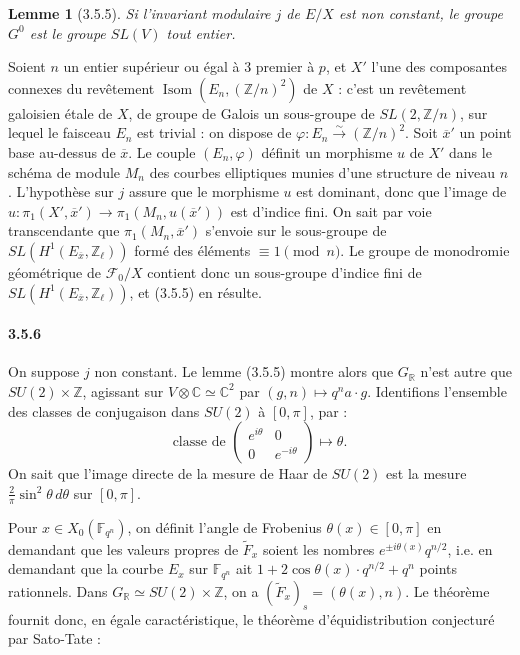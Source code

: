\documentclass[12pt,a4paper]{article}
\theoremstyle{plain}
\newtheorem{lemma}[theorem]{Lemme}
\theoremstyle{definition}
\theoremstyle{remark}
\DeclareMathOperator{\Isom}{Isom}
\newcommand{\CC}{{\mathbb{C}}}
\newcommand{\FF}{{\mathbb{F}}}
\newcommand{\RR}{{\mathbb{R}}}
\newcommand{\ZZ}{{\mathbb{Z}}}
\begin{document}
\begin{lemma}[3.5.5]
Si l'invariant modulaire $j$ de $E/X$ est non constant, le groupe $G^0$ est le groupe $SL(V)$ tout entier.
\end{lemma}

Soient $n$ un entier sup\'erieur ou \'egal \`a $3$ premier \`a $p$, et $X'$ l'une des composantes connexes du rev\^etement $\Isom(E_n, (\ZZ/n)^2)$ de $X$ : c'est un rev\^etement galoisien \'etale de $X$, de groupe de Galois un sous-groupe de $SL(2, \ZZ/n)$, sur lequel le faisceau $E_n$ est trivial : on dispose de $\varphi : E_n \xrightarrow{\sim} (\ZZ/n)^2$. Soit $\overline{x}'$ un point base au-dessus de $\overline{x}$. Le couple $(E_n, \varphi)$ d\'efinit un morphisme $u$ de $X'$ dans le sch\'ema de module $M_n$ des courbes elliptiques munies d'une structure de niveau $n$. L'hypoth\`ese sur $j$ assure que le morphisme $u$ est dominant, donc que l'image de $u : \pi_1(X', \overline{x}') \to \pi_1(M_n, u(\overline{x}'))$ est d'indice fini. On sait par voie transcendante que $\pi_1(M_n, \overline{x}')$ s'envoie sur le sous-groupe de $SL(H^1(E_{\overline{x}}, \ZZ_\ell))$ form\'e des \'el\'ements $\equiv 1 \pmod{n}$. Le groupe de monodromie g\'eom\'etrique de $\mathscr{F}_0/X$ contient donc un sous-groupe d'indice fini de $SL(H^1(E_{\overline{x}}, \ZZ_\ell))$, et (3.5.5) en r\'esulte.

\paragraph{3.5.6}
On suppose $j$ non constant. Le lemme (3.5.5) montre alors que $G_\RR$ n'est autre que $SU(2) \times \ZZ$, agissant sur $V \otimes \CC \simeq \CC^2$ par $(g, n) \mapsto q^n a \cdot g$. Identifions l'ensemble des classes de conjugaison dans $SU(2)$ \`a $[0, \pi]$, par :
\[ \text{classe de } \begin{pmatrix} e^{i\theta} & 0 \\ 0 & e^{-i\theta} \end{pmatrix} \mapsto \theta. \]
On sait que l'image directe de la mesure de Haar de $SU(2)$ est la mesure $\frac{2}{\pi} \sin^2\theta\, d\theta$ sur $[0, \pi]$.

Pour $x \in X_0(\FF_{q^n})$, on d\'efinit l'angle de Frobenius $\theta(x) \in [0, \pi]$ en demandant que les valeurs propres de $\tilde{F}_x$ soient les nombres $e^{\pm i\theta(x)} q^{n/2}$, i.e. en demandant que la courbe $E_x$ sur $\FF_{q^n}$ ait $1 + 2\cos\theta(x) \cdot q^{n/2} + q^n$ points rationnels. Dans $G_\RR \simeq SU(2) \times \ZZ$, on a $(\tilde{F}_x)_s = (\theta(x), n)$. Le th\'eor\`eme fournit donc, en \'egale caract\'eristique, le th\'eor\`eme d'\'equidistribution conjectur\'e par Sato-Tate :
\end{document}

